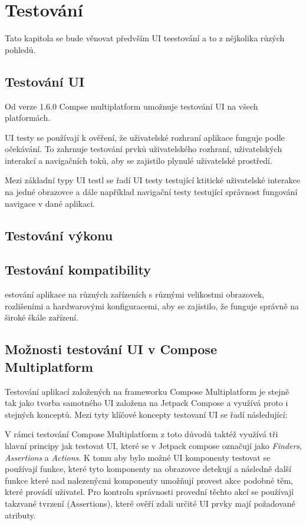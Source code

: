\chapter{Testování} \label{testsSection}
Tato kapitola se bude věnovat předvším UI teestování a to z nějkolika růzých pohledů. 

\section{Testování UI}
Od verze 1.6.0 Compse multiplatform umožnuje testování UI na všech platformách. \cite{composeNews1.6.0}

UI testy se používají k ověření, že uživatelské rozhraní aplikace funguje podle očekávání. To zahrnuje testování prvků uživatelského rozhraní, uživatelských 
interakcí a navigačních toků, aby se zajistilo plynulé uživatelské prostředí.

Mezi základní typy UI testl se řadí UI testy testující ktitické uživatelské interakce na jedné obrazovce a dále například navigační testy testující
správnost fungování navigace v dané aplikaci.


\section{Testování výkonu}


\section{Testování kompatibility}
estování aplikace na různých zařízeních s různými velikostmi obrazovek, rozlišeními a hardwarovými konfiguracemi, aby se zajistilo, že funguje 
správně na široké škále zařízení.




\section{Možnosti testování UI v Compose Multiplatform}
Testování aplikací založených na frameworku Compose Multiplatform je stejně tak jako tvorba samotného UI založena na Jetpack Compose a využívá 
proto i stejných konceptů. Mezi tyty klíčové koncepty testovaní UI se řadí následující:


V rámci testování
Compose Multiplatform z toto důvodů taktéž využívá tři hlavní principy jak testovat UI, které se v Jetpack compose
označují jako \textit{Finders}, \textit{Assertions} a \textit{Actions}. 
K tomu aby bylo možné UI komponenty testovat se používají funkce, které tyto komponenty na obrazovce detekují a následně další funkce které nad nalezenýcmi 
komponenty umožňují provest akce podobné těm, které provádí uživatel. Pro kontrolu správnosti provední těchto akcí se používají takzvané tvrzení 
(Assertions), které ověří zdali určité UI prvky mají požadované atributy.

